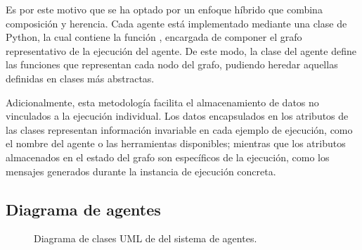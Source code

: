 Es por este motivo que se ha optado por un enfoque híbrido que combina composición y herencia. Cada agente está implementado mediante una clase de Python, la cual contiene la función , encargada de componer el grafo representativo de la ejecución del agente. De este modo, la clase del agente define las funciones que representan cada nodo del grafo, pudiendo heredar aquellas definidas en clases más abstractas.

Adicionalmente, esta metodología facilita el almacenamiento de datos no vinculados a la ejecución individual. Los datos encapsulados en los atributos de las clases representan información invariable en cada ejemplo de ejecución, como el nombre del agente o las herramientas disponibles; mientras que los atributos almacenados en el estado del grafo son específicos de la ejecución, como los mensajes generados durante la instancia de ejecución concreta.

\subsection{Diagrama de agentes}

\begin{figure}[p]
  \centering
  \caption{Diagrama de clases UML de del sistema de agentes.}
  \label{fig:uml}
\end{figure}

